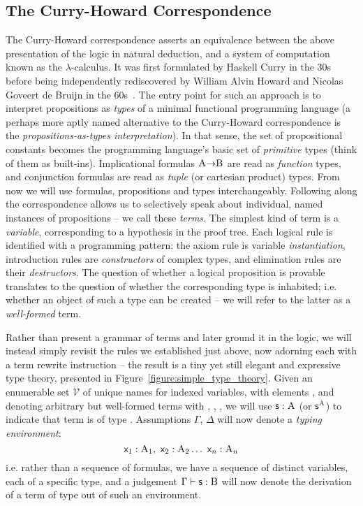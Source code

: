 \subsection{The Curry-Howard Correspondence}
The Curry-Howard correspondence asserts an equivalence between the above presentation of the logic in natural deduction, and a system of computation known as the $\lambda$-calculus.
It was first formulated by Haskell Curry in the 30s before being independently rediscovered by William Alvin Howard and Nicolas Goveert de Bruijn in the 60s~\cite{curry1934functionality,de1983automath,howard1980formulae}.
The entry point for such an approach is to interpret propositions as \textit{types} of a minimal functional programming language (a perhaps more aptly named alternative to the Curry-Howard correspondence is the \textit{propositions-as-types interpretation}).
In that sense, the set of propositional constants \propcon{} becomes the programming language's basic set of \textit{primitive} types (think of them as built-ins).
Implicational formulas $\prop A \ii \prop B$ are read as \textit{function} types, and conjunction formulas are read as \textit{tuple} (or cartesian product) types.
From now we will use formulas, propositions and types interchangeably.
Following along the correspondence allows us to selectively speak about individual, named instances of propositions -- we call these \textit{terms}.
The simplest kind of term is a \textit{variable}, corresponding to a hypothesis in the proof tree.
Each logical rule is identified with a programming pattern: the axiom rule is variable \textit{instantiation}, introduction rules are \textit{constructors} of complex types, and elimination rules are their \textit{destructors}.
The question of whether a logical proposition is provable translates to the question of whether the corresponding type is inhabited; i.e. whether an object of such a type can be created -- we will refer to the latter as a \textit{well-formed} term.

Rather than present a grammar of terms and later ground it in the logic, we will instead simply revisit the rules we established just above, now adorning each with a term rewrite instruction -- the result is a tiny yet still elegant and expressive type theory, presented in Figure~\ref{figure:simple_type_theory}.
Given an enumerable set $\mathcal{V}$ of unique names for indexed variables, with elements , and denoting arbitrary but well-formed terms with , , , we will use $\term{s}: \prop{A}$ (or $\term{s}^{\smallprop{A}}$) to indicate that term  is of type .
Assumptions $\Gamma$, $\Delta$ will now denote a \textit{typing environment}:
\[
\term x_1 : \prop  A_1 ,~ \term x_2 : \prop A_2 \dots ~ \term x_n : \prop A_n
\]
i.e. rather than a sequence of formulas, we have a sequence of distinct variables, each of a specific type, and a judgement $\Gamma \vdash \term{s} : \prop{B}$ will now denote the derivation of a term  of type  out of such an environment.

